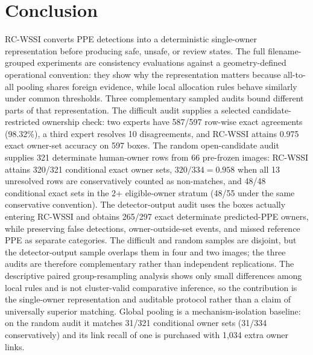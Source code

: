 \documentclass[iicol,pdflatex,sn-mathphys-num]{sn-jnl}
\begin{document}
\section{Conclusion}\label{sec:conclusion}

RC-WSSI converts PPE detections into a deterministic single-owner representation before producing safe, unsafe, or review states. The full filename-grouped experiments are consistency evaluations against a geometry-defined operational convention: they show why the representation matters because all-to-all pooling shares foreign evidence, while local allocation rules behave similarly under common thresholds. Three complementary sampled audits bound different parts of that representation. The difficult audit supplies a selected candidate-restricted ownership check: two experts have 587/597 row-wise exact agreements (98.32\%), a third expert resolves 10 disagreements, and RC-WSSI attains 0.975 exact owner-set accuracy on 597 boxes. The random open-candidate audit supplies 321 determinate human-owner rows from 66 pre-frozen images: RC-WSSI attains 320/321 conditional exact owner sets, $320/334=0.958$ when all 13 unresolved rows are conservatively counted as non-matches, and 48/48 conditional exact sets in the 2+ eligible-owner stratum (48/55 under the same conservative convention). The detector-output audit uses the boxes actually entering RC-WSSI and obtains 265/297 exact determinate predicted-PPE owners, while preserving false detections, owner-outside-set events, and missed reference PPE as separate categories. The difficult and random samples are disjoint, but the detector-output sample overlaps them in four and two images; the three audits are therefore complementary rather than independent replications. The descriptive paired group-resampling analysis shows only small differences among local rules and is not cluster-valid comparative inference, so the contribution is the single-owner representation and auditable protocol rather than a claim of universally superior matching. Global pooling is a mechanism-isolation baseline: on the random audit it matches 31/321 conditional owner sets (31/334 conservatively) and its link recall of one is purchased with 1,034 extra owner links.
\end{document}

